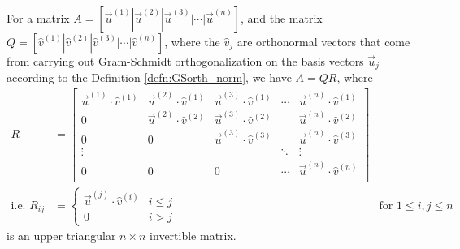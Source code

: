 \begin{proper}
\label{proper:QRdecompose}
For a matrix $A = [\vec{u}^{(1)}|\vec{u}^{(2)}|\vec{u}^{(3)}|\cdots|\vec{u}^{(n)}]$, and the matrix $Q = [\hat{v}^{(1)}|\hat{v}^{(2)}|\hat{v}^{(3)}|\cdots|\hat{v}^{(n)}]$, where the $\hat{v}_j$ are orthonormal vectors that come from carrying out Gram-Schmidt orthogonalization on the basis vectors $\vec{u}_j$ according to the Definition \ref{defn:GSorth_norm}, we have $A = QR$, where
\begin{align*}
R &= 
\begin{bmatrix}
\vec{u}^{(1)} \cdot \hat{v}^{(1)} & \vec{u}^{(2)} \cdot \hat{v}^{(1)} & \vec{u}^{(3)} \cdot \hat{v}^{(1)} & \cdots & \vec{u}^{(n)} \cdot \hat{v}^{(1)} \\
0 & \vec{u}^{(2)} \cdot \hat{v}^{(2)} & \vec{u}^{(3)} \cdot \hat{v}^{(2)} &  & \vec{u}^{(n)} \cdot \hat{v}^{(2)} \\
0 & 0 & \vec{u}^{(3)} \cdot \hat{v}^{(3)} &  & \vec{u}^{(n)} \cdot \hat{v}^{(3)} \\
\vdots & & & \ddots & \vdots\\
0 & 0 & 0 & \cdots & \vec{u}^{(n)} \cdot \hat{v}^{(n)} \\
\end{bmatrix} \\
\text{i.e. } R_{ij} &= 
\begin{cases}
\vec{u}^{(j)} \cdot \hat{v}^{(i)} & i \leq j \\
0 & i > j
\end{cases}
& \text{for $1 \leq i, j \leq n$}
\end{align*}
is an upper triangular $n \times n$ invertible matrix.
\end{proper}
